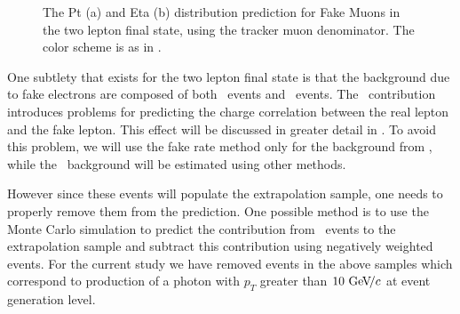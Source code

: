 \documentclass{cmspaper}
\begin{document}
\begin{figure}[htb]
  \begin{center}
    \caption{The Pt (a) and Eta (b) distribution prediction for Fake Muons in the two lepton final state, using the tracker muon denominator. The color  scheme is as in .}
    \label{fig:fakeMuonPtEta}
  \end{center}
\end{figure}


One subtlety that exists for the two lepton final state is that the background due to fake electrons are composed of both \WPlusJets\ events and \WPlusGamma\ events. The \WPlusGamma\ contribution introduces problems for predicting the charge correlation between the real lepton and the fake lepton. This effect will be discussed in greater detail in . To avoid this problem, we will use the fake rate method only for the background from \WPlusJets, while the \WPlusGamma\ background will be estimated using other methods.

However since these events will populate the extrapolation sample, one needs to properly remove them from the prediction. One possible method is to use the Monte Carlo simulation to predict the contribution from \WPlusGamma\ events to the extrapolation sample and subtract 
this contribution using negatively weighted events. For the current study we have removed events in the above samples which correspond to production of a photon 
with $p_T$ greater than $10~\mathrm{Ge\kern -0.1em V}\!/c$ at event generation level.
\end{document}
